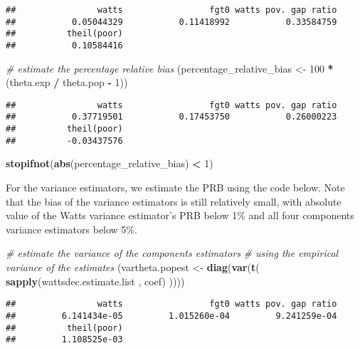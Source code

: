 \documentclass[
]{book}
\newenvironment{Shaded}{\begin{snugshade}}{\end{snugshade}}
\newcommand{\CommentTok}[1]{\textcolor[rgb]{0.56,0.35,0.01}{\textit{#1}}}
\newcommand{\DecValTok}[1]{\textcolor[rgb]{0.00,0.00,0.81}{#1}}
\newcommand{\FunctionTok}[1]{\textcolor[rgb]{0.13,0.29,0.53}{\textbf{#1}}}
\newcommand{\NormalTok}[1]{#1}
\newcommand{\OtherTok}[1]{\textcolor[rgb]{0.56,0.35,0.01}{#1}}
\newcommand{\SpecialCharTok}[1]{\textcolor[rgb]{0.81,0.36,0.00}{\textbf{#1}}}
\begin{document}
\begin{verbatim}
##                watts                 fgt0 watts pov. gap ratio 
##           0.05044329           0.11418992           0.33584759 
##          theil(poor) 
##           0.10584416
\end{verbatim}

\begin{Shaded}
\begin{Highlighting}[]
\CommentTok{\# estimate the percentage relative bias}
\NormalTok{(percentage\_relative\_bias }\OtherTok{\textless{}{-}} \DecValTok{100} \SpecialCharTok{*}\NormalTok{ (theta.exp }\SpecialCharTok{/}\NormalTok{ theta.pop }\SpecialCharTok{{-}} \DecValTok{1}\NormalTok{))}
\end{Highlighting}
\end{Shaded}

\begin{verbatim}
##                watts                 fgt0 watts pov. gap ratio 
##           0.37719501           0.17453750           0.26000223 
##          theil(poor) 
##          -0.03437576
\end{verbatim}

\begin{Shaded}
\begin{Highlighting}[]
\FunctionTok{stopifnot}\NormalTok{(}\FunctionTok{abs}\NormalTok{(percentage\_relative\_bias) }\SpecialCharTok{\textless{}} \DecValTok{1}\NormalTok{)}
\end{Highlighting}
\end{Shaded}

For the variance estimators, we estimate the PRB using the code below.
Note that the bias of the variance estimators is still relatively small, with absolute value of the Watts variance estimator's PRB below 1\% and all four components variance estimators below 5\%.

\begin{Shaded}
\begin{Highlighting}[]
\CommentTok{\# estimate the variance of the components estimators}
\CommentTok{\# using the empirical variance of the estimates}
\NormalTok{(vartheta.popest }\OtherTok{\textless{}{-}}
   \FunctionTok{diag}\NormalTok{(}\FunctionTok{var}\NormalTok{(}\FunctionTok{t}\NormalTok{(}
     \FunctionTok{sapply}\NormalTok{(wattsdec.estimate.list , coef)}
\NormalTok{   ))))}
\end{Highlighting}
\end{Shaded}

\begin{verbatim}
##                watts                 fgt0 watts pov. gap ratio 
##         6.141434e-05         1.015260e-04         9.241259e-04 
##          theil(poor) 
##         1.108525e-03
\end{verbatim}
\end{document}

